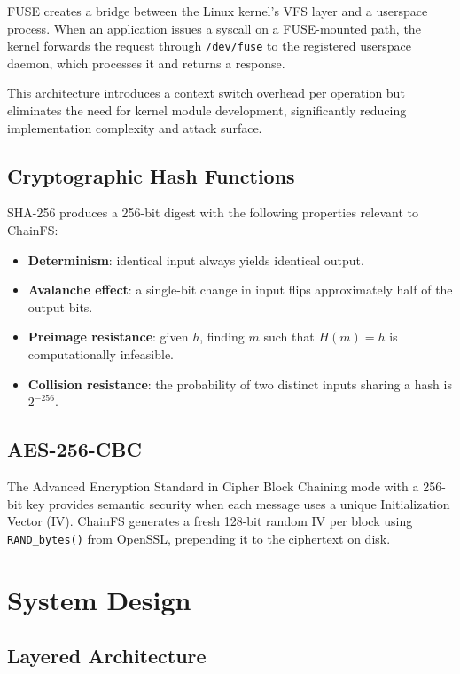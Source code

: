 \documentclass[10pt,twocolumn]{article}
\begin{document}
FUSE creates a bridge between the Linux
kernel's VFS layer and a userspace process.
When an application issues a syscall on a
FUSE-mounted path, the kernel forwards the
request through \texttt{/dev/fuse} to the
registered userspace daemon, which processes
it and returns a response.

This architecture introduces a context switch
overhead per operation but eliminates the
need for kernel module development,
significantly reducing implementation
complexity and attack surface.

\subsection{Cryptographic Hash Functions}

SHA-256 produces a 256-bit digest with
the following properties relevant to
ChainFS:

\begin{itemize}[leftmargin=*]
    \item \textbf{Determinism}: identical
    input always yields identical output.
    \item \textbf{Avalanche effect}:
    a single-bit change in input flips
    approximately half of the output bits.
    \item \textbf{Preimage resistance}:
    given $h$, finding $m$ such that
    $H(m) = h$ is computationally infeasible.
    \item \textbf{Collision resistance}:
    the probability of two distinct inputs
    sharing a hash is $2^{-256}$.
\end{itemize}

\subsection{AES-256-CBC}

The Advanced Encryption Standard in
Cipher Block Chaining mode with a 256-bit
key provides semantic security when each
message uses a unique Initialization Vector
(IV). ChainFS generates a fresh 128-bit
random IV per block using
\texttt{RAND\_bytes()} from OpenSSL,
prepending it to the ciphertext on disk.

\section{System Design}

\subsection{Layered Architecture}
\end{document}
